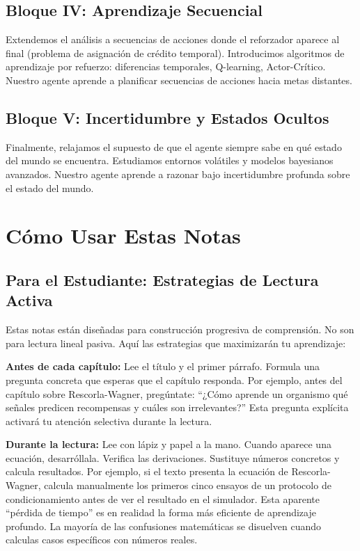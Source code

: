 \documentclass[
  letterpaper,
  DIV=11,
  numbers=noendperiod]{scrreprt}
\begin{document}
\subsection{Bloque IV: Aprendizaje
Secuencial}\label{bloque-iv-aprendizaje-secuencial}

Extendemos el análisis a secuencias de acciones donde el reforzador
aparece al final (problema de asignación de crédito temporal).
Introducimos algoritmos de aprendizaje por refuerzo: diferencias
temporales, Q-learning, Actor-Crítico. Nuestro agente aprende a
planificar secuencias de acciones hacia metas distantes.

\subsection{Bloque V: Incertidumbre y Estados
Ocultos}\label{bloque-v-incertidumbre-y-estados-ocultos}

Finalmente, relajamos el supuesto de que el agente siempre sabe en qué
estado del mundo se encuentra. Estudiamos entornos volátiles y modelos
bayesianos avanzados. Nuestro agente aprende a razonar bajo
incertidumbre profunda sobre el estado del mundo.

\section{Cómo Usar Estas Notas}\label{cuxf3mo-usar-estas-notas}

\subsection{Para el Estudiante: Estrategias de Lectura
Activa}\label{para-el-estudiante-estrategias-de-lectura-activa}

Estas notas están diseñadas para construcción progresiva de comprensión.
No son para lectura lineal pasiva. Aquí las estrategias que maximizarán
tu aprendizaje:

\textbf{Antes de cada capítulo:} Lee el título y el primer párrafo.
Formula una pregunta concreta que esperas que el capítulo responda. Por
ejemplo, antes del capítulo sobre Rescorla-Wagner, pregúntate: ``¿Cómo
aprende un organismo qué señales predicen recompensas y cuáles son
irrelevantes?'' Esta pregunta explícita activará tu atención selectiva
durante la lectura.

\textbf{Durante la lectura:} Lee con lápiz y papel a la mano. Cuando
aparece una ecuación, desarróllala. Verifica las derivaciones. Sustituye
números concretos y calcula resultados. Por ejemplo, si el texto
presenta la ecuación de Rescorla-Wagner, calcula manualmente los
primeros cinco ensayos de un protocolo de condicionamiento antes de ver
el resultado en el simulador. Esta aparente ``pérdida de tiempo'' es en
realidad la forma más eficiente de aprendizaje profundo. La mayoría de
las confusiones matemáticas se disuelven cuando calculas casos
específicos con números reales.
\end{document}
